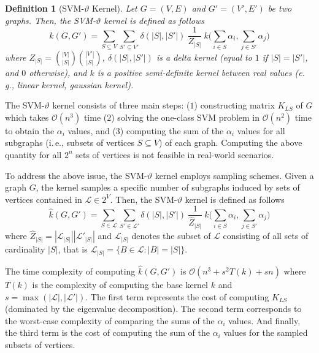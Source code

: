 \documentclass[twoside,11pt]{article}
\newcommand{\eg}{e.\,g., }
\newcommand{\ie}{i.\,e., }
\newtheorem{definition}{Definition}
\begin{document}
\begin{definition}[SVM-$\vartheta$ Kernel]
	Let $G=(V,E)$ and $G'=(V',E')$ be two graphs.
	Then, the SVM-$\vartheta$ kernel is defined as follows
	\begin{equation}
	    k(G, G') = \sum_{S \subseteq V} \sum_{S' \subseteq V'} \delta(|S|, |S'|) \ \frac{1}{Z_{|S|}} \ k \Big(\sum_{i \in S} \alpha_i, \sum_{j \in S'} \alpha_j \Big)
	\end{equation}
	where $Z_{|S|} = \binom{|V|}{|S|} \binom{|V'|}{|S|}$, $\delta(|S|, |S'|)$ is a delta kernel (equal to $1$ if $|S|=|S'|$, and $0$ otherwise), and $k$ is a positive semi-definite kernel between real values (\eg linear kernel, gaussian kernel).
\end{definition}

The SVM-$\vartheta$ kernel consists of three main steps: ($1$) constructing matrix $K_{LS}$ of $G$ which takes $\mathcal{O}(n^3)$ time ($2$) solving the one-class SVM problem in $\mathcal{O}(n^2)$ time to obtain the $\alpha_i$ values, and ($3$) computing the sum of the $\alpha_i$ values for all subgraphs (\ie subsets of vertices $S \subseteq V$) of each graph.
Computing the above quantity for all $2^n$ sets of vertices is not feasible in real-world scenarios.

To address the above issue, the SVM-$\vartheta$ kernel employs sampling schemes.
Given a graph $G$, the kernel samples a specific number of subgraphs induced by sets of vertices contained in $\mathcal{L} \in 2^V$.
Then, the SVM-$\vartheta$ kernel is defined as follows
\begin{equation}
    \hat{k}(G, G') = \sum_{S \in \mathcal{L}} \sum_{S' \in \mathcal{L}'} \delta(|S|, |S'|) \ \frac{1}{\hat{Z}_{|S|}} \ k \Big(\sum_{i \in S} \alpha_i, \sum_{j \in S'} \alpha_j \Big)
\end{equation}
where $\hat{Z}_{|S|} = |\mathcal{L}_{|S|}| |\mathcal{L}'_{|S|}|$ and $\mathcal{L}_{|S|}$ denotes the subset of $\mathcal{L}$ consisting of all sets of cardinality $|S|$, that is $\mathcal{L}_{|S|} = \{ B \in \mathcal{L} : |B| = |S| \}$.

The time complexity of computing $\hat{k}(G, G')$ is $\mathcal{O}(n^3 + s^2 T(k) + sn)$ where $T(k)$ is the complexity of computing the base kernel $k$ and $s = \max(|\mathcal{L}|, |\mathcal{L}'|)$.
The first term represents the cost of computing $K_{LS}$ (dominated by the eigenvalue decomposition).
The second term corresponds to the worst-case complexity of comparing the sums of the $\alpha_i$ values.
And finally, the third term is the cost of computing the sum of the $\alpha_i$ values for the sampled subsets of vertices.
\end{document}
